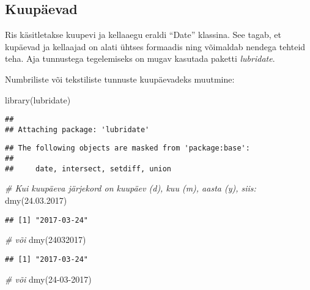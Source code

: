 \documentclass[
]{book}
\newenvironment{Shaded}{\begin{snugshade}}{\end{snugshade}}
\newcommand{\CommentTok}[1]{\textcolor[rgb]{0.56,0.35,0.01}{\textit{#1}}}
\newcommand{\DecValTok}[1]{\textcolor[rgb]{0.00,0.00,0.81}{#1}}
\newcommand{\FunctionTok}[1]{\textcolor[rgb]{0.00,0.00,0.00}{#1}}
\newcommand{\NormalTok}[1]{#1}
\newcommand{\StringTok}[1]{\textcolor[rgb]{0.31,0.60,0.02}{#1}}
\begin{document}
\hypertarget{kuupuxe4evad}{%
\subsection{Kuupäevad}\label{kuupuxe4evad}}

Ris käsitletakse kuupevi ja kellaaegu eraldi ``Date'' klassina. See tagab, et kupäevad ja kellaajad on alati ühtses formaadis ning võimaldab nendega tehteid teha. Aja tunnustega tegelemiseks on mugav kasutada paketti \emph{lubridate}.

Numbriliste või tekstiliste tunnuste kuupäevadeks muutmine:

\begin{Shaded}
\begin{Highlighting}[]
\FunctionTok{library}\NormalTok{(lubridate)}
\end{Highlighting}
\end{Shaded}

\begin{verbatim}
## 
## Attaching package: 'lubridate'
\end{verbatim}

\begin{verbatim}
## The following objects are masked from 'package:base':
## 
##     date, intersect, setdiff, union
\end{verbatim}

\begin{Shaded}
\begin{Highlighting}[]
\CommentTok{\# Kui kuupäeva järjekord on kuupäev (d), kuu (m), aasta (y), siis:}
\FunctionTok{dmy}\NormalTok{(}\StringTok{\textquotesingle{}24.03.2017\textquotesingle{}}\NormalTok{)}
\end{Highlighting}
\end{Shaded}

\begin{verbatim}
## [1] "2017-03-24"
\end{verbatim}

\begin{Shaded}
\begin{Highlighting}[]
\CommentTok{\# või}
\FunctionTok{dmy}\NormalTok{(}\DecValTok{24032017}\NormalTok{)}
\end{Highlighting}
\end{Shaded}

\begin{verbatim}
## [1] "2017-03-24"
\end{verbatim}

\begin{Shaded}
\begin{Highlighting}[]
\CommentTok{\# või}
\FunctionTok{dmy}\NormalTok{(}\StringTok{\textquotesingle{}24{-}03{-}2017\textquotesingle{}}\NormalTok{)}
\end{Highlighting}
\end{Shaded}
\end{document}
